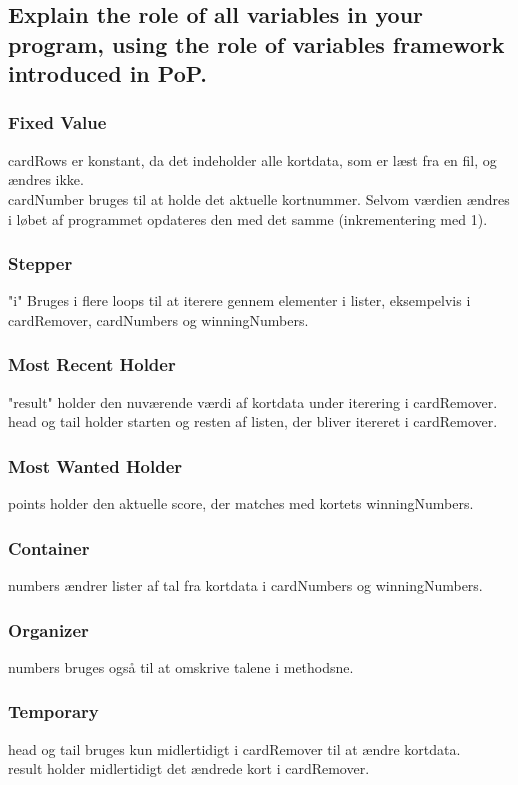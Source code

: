 \documentclass[a4paper,12pt]{article}
\begin{document}
\subsection[Explain the role of all variables in your program]{Explain the role of all variables in your program, using the role of variables framework introduced in PoP.}

\subsubsection*{Fixed Value}
cardRows er konstant, da det indeholder alle kortdata, som er læst fra en fil, og ændres ikke.\\
cardNumber bruges til at holde det aktuelle kortnummer. Selvom værdien ændres i løbet af programmet opdateres den med det samme (inkrementering med 1).

\subsubsection*{Stepper}
"i" Bruges i flere loops til at iterere gennem elementer i lister, eksempelvis i cardRemover, cardNumbers og winningNumbers.

\subsubsection*{Most Recent Holder}
"result" holder den nuværende værdi af kortdata under iterering i cardRemover.\\
head og tail holder starten og resten af listen, der bliver itereret i cardRemover.

\subsubsection*{Most Wanted Holder}
points holder den aktuelle score, der matches med kortets winningNumbers.

\subsubsection*{Container}
numbers ændrer lister af tal fra kortdata i cardNumbers og winningNumbers.

\subsubsection*{Organizer}
numbers bruges også til at omskrive talene i methodsne.

\subsubsection*{Temporary}
head og tail bruges kun midlertidigt i cardRemover til at ændre kortdata.\\
result holder midlertidigt det ændrede kort i cardRemover.
\end{document}
